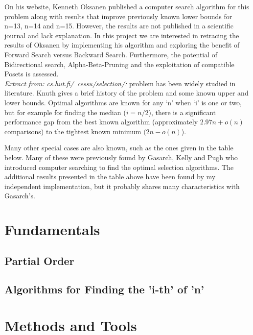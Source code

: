 \documentclass[10pt,journal,compsoc]{IEEEtran}
\begin{document}
On his website, Kenneth Oksanen \cite{Oksanen} published a computer search algorithm for this problem along with results that improve previously known lower bounds for n=13, n=14 and n=15. However, the results are not published in a scientific journal and lack explanation. \newline
In this project we are interested in retracing the results of Oksanen by implementing his algorithm and exploring the benefit of Forward Search versus Backward Search. Furthermore, the potential of Bidirectional search, Alpha-Beta-Pruning and the exploitation of compatible Posets is assessed. \newline
\\
\textit{Extract from: cs.hut.fi/~cessu/selection/:}
 problem has been widely studied
in literature. Knuth gives a brief history of the problem and some known upper and lower bounds.
Optimal algorithms are known for any `n' when `i' is one or two, but for example for finding
the median ($i = n/2$), there is a significant performance gap from the best known algorithm
(approximately $2.97 n + o(n)$ comparisons) to the tightest known minimum $(2 n - o\left (n \right )$).

Many other special cases are also known, such as the ones given in the table below. Many of
these were previously found by Gasarch, Kelly and Pugh who introduced computer searching to
find the optimal selection algorithms. The additional results presented in the table above have
been found by my independent implementation, but it probably shares many characteristics with
Gasarch's.



\section{Fundamentals}
\subsection{Partial Order}
\subsection{Algorithms for Finding the 'i-th' of 'n'}

\section{Methods and Tools}
\end{document}
